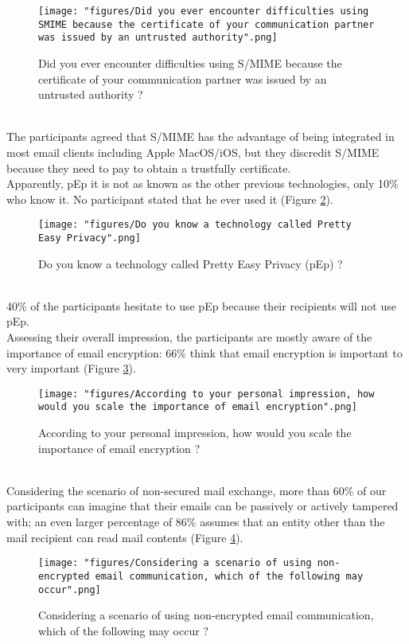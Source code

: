 \begin{figure}
	\texttt{[image: "figures/Did you ever encounter difficulties using SMIME because the certificate of your communication partner was issued by an untrusted authority".png]}
	\centering
	\caption{Did you ever encounter difficulties using S/MIME because the certificate of your communication partner was issued by an untrusted authority ?}
	\label{fig:s/mimecert}
\end{figure}\\
The participants agreed that S/MIME has the advantage of being integrated in most email clients including Apple MacOS/iOS, but they discredit S/MIME because they need to pay to obtain a trustfully certificate.\\
Apparently, pEp it is not as known as the other previous technologies, only 10\% who know it. No participant stated that he ever used it (Figure \ref{fig:pep}).\\
\begin{figure}
	\texttt{[image: "figures/Do you know a technology called Pretty Easy Privacy".png]}
	\centering
	\caption{Do you know a technology called Pretty Easy Privacy (pEp) ?}
	\label{fig:pep}
\end{figure}\\
40\% of the participants hesitate to use pEp because their recipients will not use pEp.\\
Assessing their overall impression, the participants are mostly aware of the importance of email encryption: 66\% think that email encryption is important to very important (Figure \ref{fig:impression}).\\
\begin{figure}
	\texttt{[image: "figures/According to your personal impression, how would you scale the importance of email encryption".png]}
	\centering
	\caption{According to your personal impression, how would you scale the importance of email encryption ?}
	\label{fig:impression}
\end{figure}\\
Considering the scenario of non-secured mail exchange, more than 60\% of our participants can imagine that their emails can be passively or actively tampered with; an even larger percentage of 86\% assumes that an entity other than the mail recipient can read mail contents (Figure \ref{fig:scenario}).\\
\begin{figure}
	\texttt{[image: "figures/Considering a scenario of using non-encrypted email communication, which of the following may occur".png]}
	\centering
	\caption{Considering a scenario of using non-encrypted email communication, which of the following may occur ?}
	\label{fig:scenario}
\end{figure}\\
